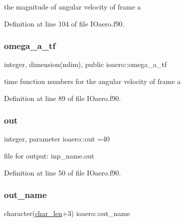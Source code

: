 the magnitude of angular velocity of frame a 



Definition at line 104 of file I\+Oaero.\+f90.

\mbox{\label{namespaceioaero_a9ec25357ecfc1c09628efa147300aaee}} 
\subsubsection{\texorpdfstring{omega\+\_\+a\+\_\+tf}{omega\_a\_tf}}
{\footnotesize\ttfamily integer, dimension(ndim), public ioaero\+::omega\+\_\+a\+\_\+tf}



time function numbers for the angular velocity of frame a 



Definition at line 89 of file I\+Oaero.\+f90.

\mbox{\label{namespaceioaero_a7c01d4bcd841d8d6281f29d5fc818fd8}} 
\subsubsection{\texorpdfstring{out}{out}}
{\footnotesize\ttfamily integer, parameter ioaero\+::out =40\hspace{0.3cm}{\ttfamily [private]}}



file for output\+: inp\+\_\+name.\+out 



Definition at line 50 of file I\+Oaero.\+f90.

\mbox{\label{namespaceioaero_a6693b9440660a84d2d2fc41ac183bb0f}} 
\subsubsection{\texorpdfstring{out\+\_\+name}{out\_name}}
{\footnotesize\ttfamily character(\hyperlink{namespaceioaero_acd6bdfdcfd986fd1c26261e5996e3b03}{char\+\_\+len}+3) ioaero\+::out\+\_\+name\hspace{0.3cm}{\ttfamily [private]}}



